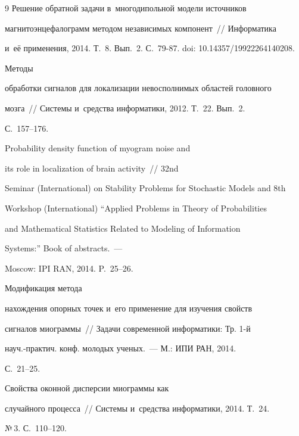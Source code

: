 {{\begin{thebibliography}{9}
Решение обратной задачи в~многодипольной модели источников

магнитоэнцефалограмм методом независимых компонент~/\!\!/ Информатика 

и~её применения, 2014. Т.~8. Вып.~2. С.~79-87. doi: 10.14357/19922264140208.




 Методы

обработки сигналов для локализации невосполнимых областей головного

мозга~/\!\!/ Системы и~средства информатики, 2012. Т.~22. Вып.~2.

С.~157--176.




 Probability density function of myogram noise and

its role in localization of brain activity~/\!\!/ 32nd 

Seminar (International) on Stability Problems for Stochastic Models and 8th

 Workshop (International) ``Applied Problems in Theory of Probabilities

and Mathematical Statistics Related to Modeling of Information

Systems:'' Book of abstracts.~--- 

Moscow: IPI RAN, 2014. P.~25--26.




 Модификация метода

нахождения опорных точек и~его применение для изучения свойств

сигналов миограммы~/\!\!/ Задачи современной информатики: Тр. 1-й

науч.-практич. конф. молодых ученых.~--- М.: ИПИ РАН, 2014.

С.~21--25.




 Свойства оконной дисперсии миограммы как

случайного процесса~/\!\!/ Системы и~средства информатики, 2014. Т.~24.

№\,3. С.~110--120.



   \end{thebibliography}

} }





